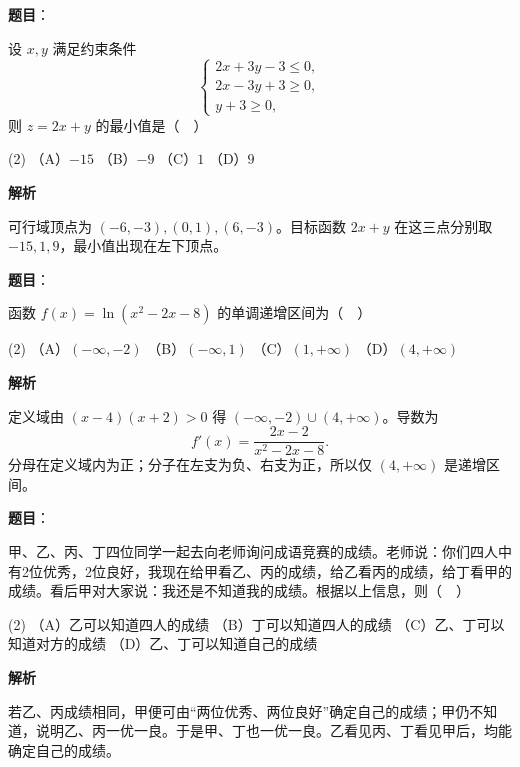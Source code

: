 \begin{answer}

\textbf{题目}：

设 \(x,y\) 满足约束条件
\nopagebreak[4]
\[
\begin{cases}
2x+3y-3\le 0,\\
2x-3y+3\ge 0,\\
y+3\ge 0,
\end{cases}
\]
则 \(z=2x+y\) 的最小值是（　）

\begin{gkopts}(2)
\task （A）\(-15\)
\task （B）\(-9\)
\task （C）\(1\)
\task （D）\(9\)
\end{gkopts}

\textbf{解析}

可行域顶点为 \((-6,-3),(0,1),(6,-3)\)。目标函数 \(2x+y\) 在这三点分别取 \(-15,1,9\)，最小值出现在左下顶点。


\end{answer}
\begin{answer}

\textbf{题目}：

函数 \(f(x)=\ln(x^2-2x-8)\) 的单调递增区间为（　）

\begin{gkopts}(2)
\task （A）\((-\infty,-2)\)
\task （B）\((-\infty,1)\)
\task （C）\((1,+\infty)\)
\task （D）\((4,+\infty)\)
\end{gkopts}

\textbf{解析}

定义域由 \((x-4)(x+2)>0\) 得 \(( -\infty,-2)\cup(4,+\infty)\)。导数为
\nopagebreak[4]
\[
f'(x)=\frac{2x-2}{x^2-2x-8}.
\]
分母在定义域内为正；分子在左支为负、右支为正，所以仅 \((4,+\infty)\) 是递增区间。


\end{answer}
\begin{answer}

\textbf{题目}：

甲、乙、丙、丁四位同学一起去向老师询问成语竞赛的成绩。老师说：你们四人中有2位优秀，2位良好，我现在给甲看乙、丙的成绩，给乙看丙的成绩，给丁看甲的成绩。看后甲对大家说：我还是不知道我的成绩。根据以上信息，则（　）

\begin{gkopts}(2)
\task （A）乙可以知道四人的成绩
\task （B）丁可以知道四人的成绩
\task （C）乙、丁可以知道对方的成绩
\task （D）乙、丁可以知道自己的成绩
\end{gkopts}

\textbf{解析}

若乙、丙成绩相同，甲便可由“两位优秀、两位良好”确定自己的成绩；甲仍不知道，说明乙、丙一优一良。于是甲、丁也一优一良。乙看见丙、丁看见甲后，均能确定自己的成绩。


\end{answer}
